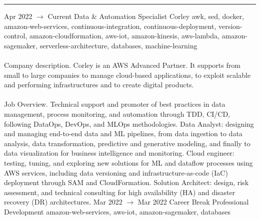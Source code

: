 \documentclass[9pt]{stackoverflow} %
\begin{document}

\textcolor{stackoverflow}{\hrule}
\vspace{4pt} %
\begin{tcolorbox}[blanker,width=0.75\textwidth,enlarge left by=0.25\textwidth,before skip=6pt,breakable,
	overlay unbroken and first={%
	  \node[inner sep=0pt,outer sep=0pt,text width=0.35\textwidth,
		align=none,
		below right]
		at ([xshift=-0.25\textwidth]frame.north west)
{
	\cvsect{Experience}
};}]
{\vspace{-16.3pt} %
	\small\begin{entrylist}
	\entry
		{Apr 2022 $\rightarrow$ Current}
		{Data \& Automation Specialist}
		{Corley}
		{{awk, sed, docker, amazon-web-services, continuous-integration, continuous-deployment, version-control, amazon-cloudformation, aws-iot, amazon-kinesis, aws-lambda, amazon-sagemaker, serverless-architecture, databases, machine-learning}\\\\
		Company description. Corley is an AWS Advanced Partner. It supports from small to large companies to manage cloud-based applications,
		to exploit scalable and performing infrastructures and to create digital products.\\\\
		Job Overview. Technical support and promoter of best practices in data management, process monitoring, and automation through TDD, CI/CD, following DataOps, DevOps, and MLOps methodologies.
		Data Analyst: designing and managing end-to-end data and ML pipelines, from data ingestion to data analysis, data transformation, predictive and generative modeling, and finally to data visualization for business intelligence and monitoring.
		Cloud engineer: testing, tuning, and exploring new solutions for ML and dataflow processes using AWS services, including data versioning and infrastructure-as-code (IaC) deployment through SAM and CloudFormation.
		Solution Architect: design, risk assessment, and technical consulting for high availability (HA) and disaster recovery (DR) architectures.}
	\entry
		{Mar 2022 $\rightarrow$ Mar 2022}
		{Career Break}
		{Professional Development}
		{{amazon-web-services, aws-iot, amazon-sagemaker, databases}\\\\
}
\end{entrylist}}
\end{tcolorbox}
\end{document}
